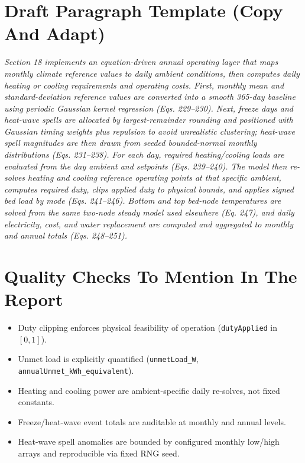 \documentclass[11pt]{article}
\begin{document}
\section{Draft Paragraph Template (Copy And Adapt)}
\textit{Section 18 implements an equation-driven annual operating layer that maps monthly climate reference values to daily ambient conditions, then computes daily heating or cooling requirements and operating costs. First, monthly mean and standard-deviation reference values are converted into a smooth 365-day baseline using periodic Gaussian kernel regression (Eqs. 229--230). Next, freeze days and heat-wave spells are allocated by largest-remainder rounding and positioned with Gaussian timing weights plus repulsion to avoid unrealistic clustering; heat-wave spell magnitudes are then drawn from seeded bounded-normal monthly distributions (Eqs. 231--238). For each day, required heating/cooling loads are evaluated from the day ambient and setpoints (Eqs. 239--240). The model then re-solves heating and cooling reference operating points at that specific ambient, computes required duty, clips applied duty to physical bounds, and applies signed bed load by mode (Eqs. 241--246). Bottom and top bed-node temperatures are solved from the same two-node steady model used elsewhere (Eq. 247), and daily electricity, cost, and water replacement are computed and aggregated to monthly and annual totals (Eqs. 248--251).}

\section{Quality Checks To Mention In The Report}
\begin{itemize}[leftmargin=*]
\item Duty clipping enforces physical feasibility of operation (\texttt{dutyApplied} in $[0,1]$).
\item Unmet load is explicitly quantified (\texttt{unmetLoad\_W}, \texttt{annualUnmet\_kWh\_equivalent}).
\item Heating and cooling power are ambient-specific daily re-solves, not fixed constants.
\item Freeze/heat-wave event totals are auditable at monthly and annual levels.
\item Heat-wave spell anomalies are bounded by configured monthly low/high arrays and reproducible via fixed RNG seed.
\end{itemize}
\end{document}
